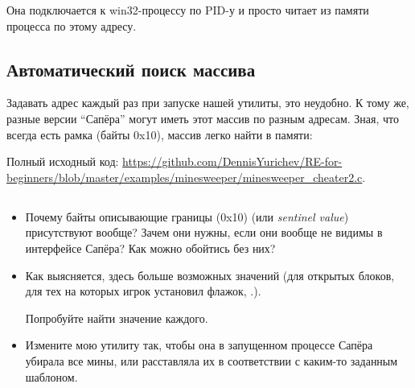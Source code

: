 Она подключается к win32-процессу по \ac{PID}-у и просто читает из памяти процесса по этому адресу.

\subsection{Автоматический поиск массива}

Задавать адрес каждый раз при запуске нашей утилиты, это неудобно.
К тому же, разные версии ``Сапёра'' могут иметь этот массив по разным адресам.
Зная, что всегда есть рамка (байты 0x10), массив легко найти в памяти:



Полный исходный код: \url{https://github.com/DennisYurichev/RE-for-beginners/blob/master/examples/minesweeper/minesweeper_cheater2.c}.

\subsection{\Exercises}

\begin{itemize}

\item
Почему байты описывающие границы (0x10) (или \emph{sentinel value}) присутствуют вообще?
Зачем они нужны, если они вообще не видимы в интерфейсе Сапёра?
Как можно обойтись без них?

\item
Как выясняется, здесь больше возможных значений (для открытых блоков, для тех на которых игрок установил
флажок, \etc{}.).
	
Попробуйте найти значение каждого.

\item Измените мою утилиту так, чтобы она в запущенном процессе Сапёра убирала все мины, 
или расставляла их в соответствии с каким-то заданным шаблоном.

\end{itemize}
